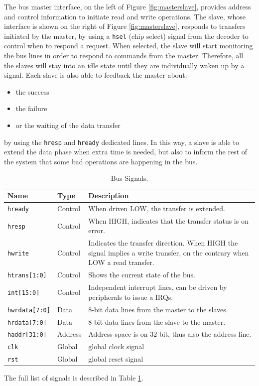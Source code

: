 The bus master interface, on the left of Figure \ref{fig:masterslave}, provides address and control information to initiate read and write operations.
The slave, whose interface is shown on the right of Figure \ref{fig:masterslave}, responds to transfers initiated by the master, by using a \texttt{hsel} (chip select) signal from the decoder to control when to respond a request. When selected, the slave will start monitoring the bus lines in order to respond to commands from the master. Therefore, all the slaves will stay into an idle state until they are individually waken up by a signal.\vspace{5mm} \newline 
Each slave is also able to feedback the master about:
\begin{itemize}
\item the success
\item the failure
\item or the waiting of the data transfer
\end{itemize}
by using the \texttt{hresp} and \texttt{hready} dedicated lines. In this way, a slave is able to extend the data phase when extra time is needed, but also to inform the rest of the system that some bad operations are happening in the bus.
\begin{table}
\centering
\begin{tabular}{| l | l | p{7cm} |}
    \hline
    \textbf{Name} & \textbf{Type} & \textbf{Description}\\ \hline
    \texttt{hready} & Control & When driven LOW, the transfer is extended.  \\ \hline
    \texttt{hresp} & Control & When HIGH, indicates that the transfer status is on error.  \\ \hline
    \texttt{hwrite} & Control & Indicates the transfer direction. When HIGH the signal implies a write transfer, on the contrary when LOW a read transfer.\\ \hline
    \texttt{htrans[1:0]} & Control & Shows the current state of the bus.\\ \hline
    \texttt{int[15:0]} & Control & Independent interrupt lines, can be driven by peripherals to issue a IRQs. \\ \hline
    \texttt{hwrdata[7:0]} & Data & 8-bit data lines from the master to the slaves. \\ \hline
    \texttt{hrdata[7:0]} & Data & 8-bit data lines from the slave to the master.  \\ \hline
    \texttt{haddr[31:0]} & Address & Address space is on 32-bit, thus also the address line. \\ \hline
    \texttt{clk} & Global & global clock signal \\ \hline
    \texttt{rst} & Global & global reset signal \\ \hline
    \hline
\end{tabular}
\caption{Bus Signals.}
\label{tab:bussig} %
\end{table}
The full list of signals is described in Table \ref{tab:bussig}.

